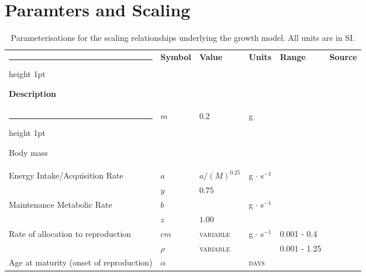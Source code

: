 \documentclass[a4paper]{article} %
\makeatletter
\newcommand{\thickhline}{%
    \noalign {\ifnum 0=`}\fi \hrule height 1pt
    \futurelet \reserved@a \@xhline
}
\makeatother
\begin{document}
\section{Paramters and Scaling}
\begin{table}[H]
    \caption{Parameterisations for the scaling relationships underlying the growth model. All units are in SI.}
    \begin{tabularx}{\linewidth}{Xlllll}
    \thickhline
    \textbf{Description}                                                            & \textbf{Symbol}      & \textbf{Value}                 & \textbf{Units}     & \textbf{Range}   & \textbf{Source}   \\ \thickhline
    Body mass                                                                       & $m$                  & 0.2                            & g    &                  &                   \\ \hline
    Energy Intake/Acquisition Rate                                                  & $a$                   & $a/(M)^{0.25}$                & g $\cdot$ s$^{-1}$ &                  &                   \\ 
                                                                                    & $y$                  & $0.75$                         & \textsc{}          &                  &                   \\ \hline
    Maintenance Metabolic Rate                                                      & $b$                  &                                & g $\cdot$ s$^{-1}$ &                  &                   \\ 
                                                                                    & $z$                  & $1.00$                         & \textsc{}          &                  &                   \\ \hline
    Rate of allocation to reproduction                                              & $cm$                 & \textsc{variable}              & g $\cdot$ s$^{-1}$ & 0.001 - 0.4      &                   \\  %
                                                                                    & $\rho$               & \textsc{variable}              & \textsc{}          & 0.001 - 1.25     &                   \\ \hline %
    Age at maturity (onset of reproduction)                                         & $\alpha$             &                                & \textsc{days}      &                  &                   \\ \hline

\end{tabularx}
\end{table}
\end{document}
